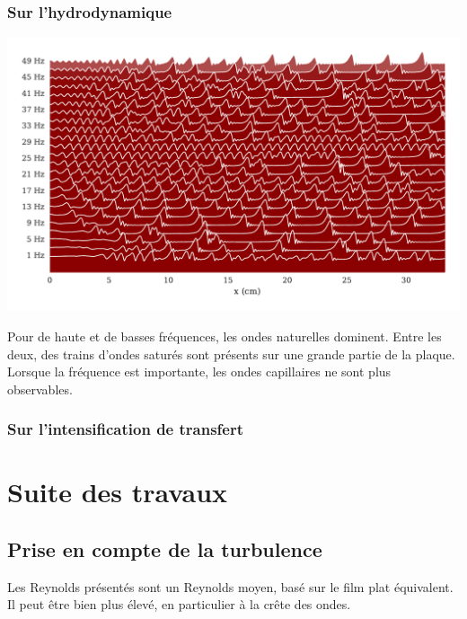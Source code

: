 \documentclass[a0,portrait]{a0poster}
\begin{document}
\begin{multicols}{2}
\begin{multicols}{2}
        \subsubsection*{Sur l'hydrodynamique}

        \begin{center}
            \includegraphics[width=0.98\columnwidth]{01-frequency_effect}
            \label{fig:freq_effect}
        \end{center}

        Pour de haute et de basses fréquences, les ondes naturelles dominent. Entre les deux, des trains d'ondes saturés sont présents sur une grande partie de la plaque. Lorsque la fréquence est importante, les ondes capillaires ne sont plus observables.

        \columnbreak

        \subsubsection*{Sur l'intensification de transfert}
    \end{multicols}

    \section*{Suite des travaux}

    \begin{multicols}{2}
        \subsection*{Prise en compte de la turbulence}
        Les Reynolds présentés sont un Reynolds moyen, basé sur le film plat équivalent. Il peut être bien plus élevé, en particulier à la crête des ondes.


\end{multicols}
\end{multicols}
\end{document}
